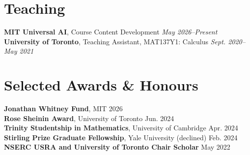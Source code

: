 \documentclass[10pt, letterpaper]{article}
\newenvironment{onecolentry}{
    \begin{adjustwidth}{
    }{
    }
}{
    \end{adjustwidth}
} %
\begin{document}
\section{Teaching}
\begin{onecolentry}
    \textbf{MIT Universal AI}, Course Content Development \hfill \textit{May 2026--Present} \\
    \textbf{University of Toronto}, Teaching Assistant,
    MAT137Y1: Calculus
    \hfill \textit{Sept. 2020--May 2021}
\end{onecolentry}
\vspace{-0.1cm}
\section{Selected Awards \& Honours}
\begin{onecolentry}
    \textbf{Jonathan Whitney Fund}, MIT \hfill 2026 \\
    \textbf{Rose Sheinin Award}, University of Toronto \hfill Jun. 2024 \\
    \textbf{Trinity Studentship in Mathematics}, University of Cambridge \hfill Apr. 2024 \\
    \textbf{Stirling Prize Graduate Fellowship}, Yale University (declined) \hfill Feb. 2024 \\
    \textbf{NSERC USRA and University of Toronto Chair Scholar} \hfill May 2022
\end{onecolentry}
\end{document}
